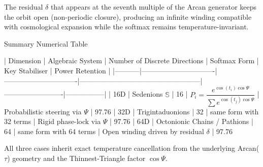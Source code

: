 The residual \(\delta\) that appears at the seventh multiple of the Arcan generator keeps the orbit open (non-periodic closure), producing an infinite winding compatible with cosmological expansion while the softmax remains temperature-invariant.

Summary Numerical Table

| Dimension | Algebraic System              | Number of Discrete Directions | Softmax Form                                      | Key Stabiliser          | Power Retention |
|-----------|-------------------------------|-------------------------------|---------------------------------------------------|-------------------------|-----------------|
| 16D   | Sedenions \(\mathbb{S}\)     | 16                            | \(P_i = \dfrac{e^{\cos(t_i)\cos\Psi}}{\sum e^{\cos(t_j)\cos\Psi}}\) | Probabilistic steering via \(\Psi\) | 97.76 %
| 32D   | Trigintaduonions              | 32                            | same form with 32 terms                           | Rigid phase-lock via \(\Psi\) | 97.76 %
| 64D   | Octonionic Chains / Pathions  | 64                            | same form with 64 terms                           | Open winding driven by residual \(\delta\) | 97.76 %

All three cases inherit exact temperature cancellation from the underlying Arcan(\(\tau\)) geometry and the Thinnest-Triangle factor \(\cos\Psi\).
